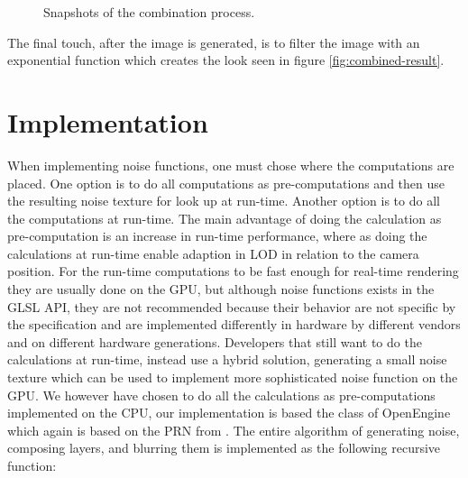 \begin{figure}[!h]
    \centering
  \hspace{4mm}
  \hspace{4mm}
  \hspace{4mm}
  \caption{Snapshots of the combination process.}
  \label{fig:combined-layers}
\end{figure}

The final touch, after the image is generated, is to filter the image
with an exponential function which creates the look seen in figure
\ref{fig:combined-result}.

\section{Implementation}
When implementing noise functions, one must chose where the
computations are placed. One option is to do all computations as
pre-computations and then use the resulting noise texture for look up
at run-time. Another option is to do all the computations at
run-time. The main advantage of doing the calculation as pre-computation
is an increase in run-time performance, where as doing the calculations
at run-time enable adaption in LOD in relation to the camera
position. For the run-time computations to be fast enough for
real-time rendering they are usually done on the GPU, but although noise
functions exists in the GLSL API\citebook{}{}, they are not recommended because
their behavior are not specific by the specification and are
implemented differently in hardware by different vendors and on different
hardware generations. Developers that still want to do the calculations
at run-time, instead use a hybrid solution, generating a small noise
texture which can be used to implement more sophisticated noise
function on the GPU.
%
We however have chosen to do all the calculations as pre-computations
implemented on the CPU, our implementation is based the
 class of OpenEngine which again is based on the
PRN from .
%
The entire algorithm of generating noise, composing layers, and
blurring them is implemented as the following recursive function:


